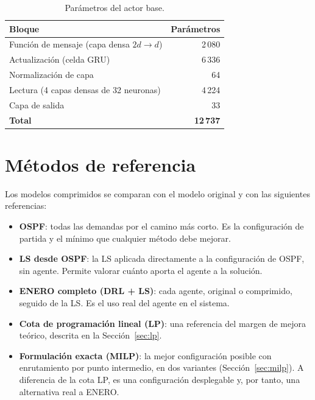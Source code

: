 \begin{table}[H]
	\centering
	\small
	\begin{tabular}{lr}
		\toprule
		\textbf{Bloque} & \textbf{Parámetros} \\
		\midrule
		Función de mensaje (capa densa $2d \rightarrow d$) & 2\,080 \\
		Actualización (celda GRU) & 6\,336 \\
		Normalización de capa & 64 \\
		Lectura (4 capas densas de 32 neuronas) & 4\,224 \\
		Capa de salida & 33 \\
		\midrule
		\textbf{Total} & \textbf{12\,737} \\
		\bottomrule
	\end{tabular}
	\caption{Parámetros del actor base.}
	\label{tab:parametros_actor}
\end{table}

\section{Métodos de referencia}\label{sec:referencias}

Los modelos comprimidos se comparan con el modelo original y con las siguientes referencias:

\begin{itemize}
	\item \textbf{OSPF}: todas las demandas por el camino más corto. Es la configuración de partida y el mínimo que cualquier método debe mejorar.
	\item \textbf{LS desde OSPF}: la LS aplicada directamente a la configuración de OSPF, sin agente. Permite valorar cuánto aporta el agente a la solución.
	\item \textbf{ENERO completo (DRL + LS)}: cada agente, original o comprimido, seguido de la LS. Es el uso real del agente en el sistema.
	\item \textbf{Cota de programación lineal (LP)}: una referencia del margen de mejora teórico, descrita en la Sección~\ref{sec:lp}.
	\item \textbf{Formulación exacta (MILP)}: la mejor configuración posible con enrutamiento por punto intermedio, en dos variantes (Sección~\ref{sec:milp}). A diferencia de la cota LP, es una configuración desplegable y, por tanto, una alternativa real a ENERO.
\end{itemize}

